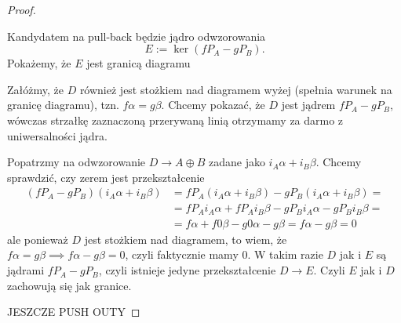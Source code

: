 \begin{proof}
  \begin{center}\end{center}
  Kandydatem na pull-back będzie jądro odwzorowania
  $$E:=\ker(fP_A-gP_B).$$
  Pokażemy, że $E$ jest granicą diagramu

  \begin{center}\end{center}
  Załóżmy, że $D$ również jest stożkiem nad diagramem wyżej (spełnia warunek na granicę diagramu), tzn. $f\alpha=g\beta$. Chcemy pokazać, że $D$ jest jądrem $fP_A-gP_B$, wówczas strzałkę zaznaczoną przerywaną linią otrzymamy za darmo z uniwersalności jądra.

  Popatrzmy na odwzorowanie $D\to A\oplus B$ zadane jako $i_A\alpha+i_B\beta$. Chcemy sprawdzić, czy zerem jest przekształcenie
  \begin{align*}
    (fP_A-gP_B)(i_A\alpha+i_B\beta)&=fP_A(i_A\alpha+i_B\beta)-gP_B(i_A\alpha+i_B\beta)=\\ 
                                   &=fP_Ai_A\alpha+fP_Ai_B\beta-gP_Bi_A\alpha-gP_Bi_B\beta=\\ 
                                   &=f\alpha+f0\beta - g0\alpha-g\beta=f\alpha-g\beta=0
  \end{align*}
  ale ponieważ $D$ jest stożkiem nad diagramem, to wiem, że $f\alpha=g\beta\implies f\alpha-g\beta=0$, czyli faktycznie mamy $0$. W takim razie $D$ jak i $E$ są jądrami $fP_A-gP_B$, czyli istnieje jedyne przekształcenie $D\to E$. Czyli $E$ jak i $D$ zachowują się jak granice. 

  {\large\color{red}JESZCZE PUSH OUTY}

\end{proof}

